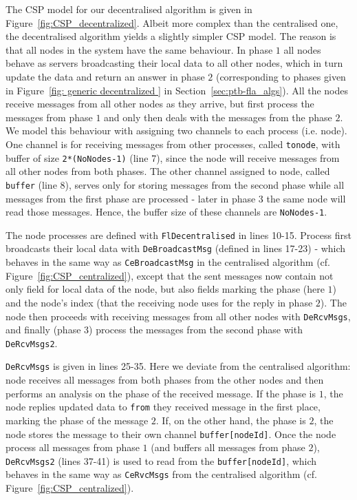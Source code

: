 \documentclass[runningheads]{llncs}
\begin{document}
The CSP model for our decentralised algorithm is given in Figure~\ref{fig:CSP_decentralized}. 
Albeit more complex than the centralised one, the decentralised algorithm yields a slightly simpler CSP model. 
The reason is that all nodes in the system have the same behaviour. In phase $1$ all nodes behave as servers broadcasting their local data to all other nodes, which in turn update the data and return an answer in phase $2$ (corresponding to phases given in Figure~\ref{fig: generic decentralized } in Section~\ref{sec:ptb-fla_algs}). 
All the nodes receive messages from all other nodes as they arrive, but first process the messages from phase $1$ and only then deals with the messages from the phase $2$. 
We model this behaviour with assigning two channels to each process (i.e. node). 
One channel is for receiving messages from other processes, called \lstinline{tonode}, with buffer of size \lstinline{2*(NoNodes-1)} (line 7), since the node will receive messages from all other nodes from both phases. 
The other channel assigned to node, called \lstinline{buffer} (line 8), serves only for storing messages from the second phase while all messages from the first phase are processed - later in phase $3$ the same node will read those messages. 
Hence, the buffer size of these channels are \lstinline{NoNodes-1}. 

The node processes are defined with \lstinline{FlDecentralised} in lines 10-15. 
Process first broadcasts their local data with \lstinline{DeBroadcastMsg} (defined in lines 17-23) - which behaves in the same way as \lstinline{CeBroadcastMsg} in the centralised algorithm (cf. Figure~\ref{fig:CSP_centralized}), except that the sent messages now contain not only field for local data of the node, but also fields marking the phase (here $1$) and the node's index (that the receiving node uses for the reply in phase $2$). 
The node then proceeds with receiving messages from all other nodes with \lstinline{DeRcvMsgs}, and finally (phase $3$) process the messages from the second phase with \lstinline{DeRcvMsgs2}.

\lstinline{DeRcvMsgs} is given in lines 25-35. 
Here we deviate from the centralised algorithm: node receives all messages from both phases from the other nodes and then performs an analysis on the phase of the received message. 
If the phase is $1$, the node replies updated data to \lstinline{from} they received message in the first place, marking the phase of the message $2$. 
If, on the other hand, the phase is $2$, the node stores the message to their own channel \lstinline{buffer[nodeId]}. 
Once the node process all messages from phase $1$ (and buffers all messages from phase $2$), \lstinline{DeRcvMsgs2} (lines 37-41) is used to read from the \lstinline{buffer[nodeId]}, which behaves in the same way as \lstinline{CeRvcMsgs} from the centralised algorithm (cf. Figure~\ref{fig:CSP_centralized}). 
\end{document}
